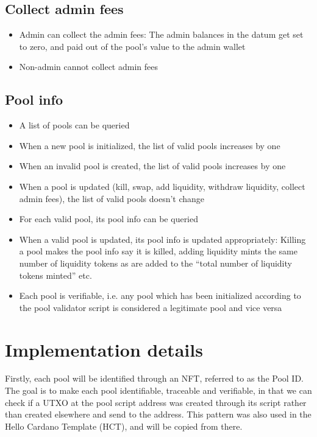 \documentclass{article}
\begin{document}
\subsection*{Collect admin fees}

\begin{itemize}
  \item Admin can collect the admin fees: The admin balances in the datum get
    set to zero, and paid out of the pool's value to the admin wallet
  \item Non-admin cannot collect admin fees
\end{itemize}

\subsection*{Pool info}

\begin{itemize}
  \item A list of pools can be queried
  \item When a new pool is initialized, the list of valid pools increases by one
  \item When an invalid pool is created, the list of valid pools increases by
    one
  \item When a pool is updated (kill, swap, add liquidity, withdraw liquidity,
    collect admin fees), the list of valid pools doesn't change
  \item For each valid pool, its pool info can be queried
  \item When a valid pool is updated, its pool info is updated appropriately:
    Killing a pool makes the pool info say it is killed, adding liquidity mints
    the same number of liquidity tokens as are added to the ``total number of
    liquidity tokens minted'' etc.
  \item Each pool is verifiable, i.e. any pool which has been initialized
    according to the pool validator script is considered a legitimate pool and
    vice versa
\end{itemize}

\section{Implementation details}

Firstly, each pool will be identified through an NFT, referred to as the Pool
ID. The goal is to make each pool identifiable, traceable and verifiable, in
that we can check if a UTXO at the pool script address was created through its
script rather than created elsewhere and send to the address. This pattern was
also used in the Hello Cardano Template (HCT), and will be copied from there. \\
\end{document}
